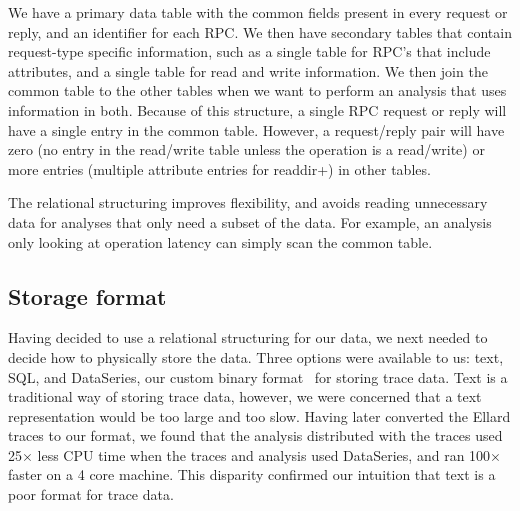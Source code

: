 We have a primary data table with the common fields present in every
request or reply, and an identifier for each RPC.  We then have
secondary tables that contain request-type specific information, such
as a single table for RPC's that include attributes, and a single
table for read and write information.  We then join the common table
to the other tables when we want to perform an analysis that uses
information in both.  Because of this structure, a single RPC request
or reply will have a single entry in the common table.  However, a
request/reply pair will have zero (no entry in the read/write table
unless the operation is a read/write) or more entries (multiple
attribute entries for readdir+) in other tables.

The relational structuring improves flexibility, and avoids reading unnecessary data for
analyses that only need a subset of the data.
For example, an analysis only looking at operation
latency can simply scan the common table.

\subsection{Storage format}

Having decided to use a relational structuring for our data, we next
needed to decide how to physically store the data.  Three
options were available to us: text, SQL, and DataSeries, our custom
binary format~\cite{DataSeriesOSR2009} for storing trace data.
Text is a traditional way of storing trace data, however, we were
concerned that a text representation would be too large and too slow.
Having later converted the Ellard traces to our format, we found that
the analysis distributed with the traces used 25$\times$ less CPU time when
the traces and analysis used DataSeries, and ran 100$\times$ faster on a 4
core machine. This disparity confirmed our intuition that text is a
poor format for trace data.



